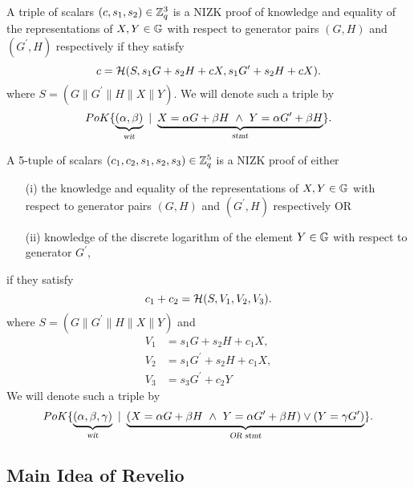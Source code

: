 \begin{definition}
    A triple of scalars $(c,s_1,s_2) \in \mathbb{Z}_q^3$ is a NIZK proof of knowledge and equality of the representations of $X,Y \in \mathbb{G}$ with respect to generator pairs $(G,H)$ and $(G^{\prime}, H)$ respectively if they satisfy
    $$ c = \mathcal{H}(S, s_1G+ s_2H+ cX,s_1G^{\prime} + s_2H + cX). $$where $S = (G\|G^{\prime}\|H\|X\|Y)$. We will denote such a triple by 
    \begin{equation*}
        PoK\{\underbrace{(\alpha, \beta)}_{\textsl{wit}} \ | \ \underbrace{X = \alpha G + \beta H \ \wedge \ Y = \alpha G^{\prime} + \beta H}_{\textsl{stmt}} \}.
    \end{equation*}
\end{definition}

\begin{definition}
    A 5-tuple of scalars $(c_1,c_2,s_1,s_2,s_3) \in \mathbb{Z}_q^5$ is a NIZK proof of either
    \begin{enumerate}
        \item[(i)] the knowledge and equality of the representations of $X,Y \in \mathbb{G}$ with respect to generator pairs $(G,H)$ and $(G^{\prime}, H)$ respectively OR
        \item[(ii)] knowledge of the discrete logarithm of the element $Y \in \mathbb{G}$ with respect to generator $G^{\prime}$, 
    \end{enumerate}  
    if they satisfy
    $$ c_1 + c_2 = \mathcal{H}(S, V_1, V_2, V_3). $$where $S = (G\|G^{\prime}\|H\|X\|Y)$ and 
    \begin{align*}
        V_1 &= s_1G+ s_2H+ c_1X, \\
        V_2 &= s_1G^{\prime}+ s_2H+ c_1X, \\
        V_3 &= s_3G^{\prime}+ c_2Y
    \end{align*}
    We will denote such a triple by 
    \begin{equation*}
        PoK\{\underbrace{(\alpha, \beta, \gamma)}_{\textsl{wit}} \ | \ \underbrace{(X = \alpha G + \beta H \ \wedge \ Y = \alpha G^{\prime} + \beta H) \vee (Y = \gamma G^{\prime})}_{\textsl{OR stmt}} \}.
    \end{equation*}
\end{definition}

\subsection{Main Idea of \textnormal{{\selectfont Revelio}}}

